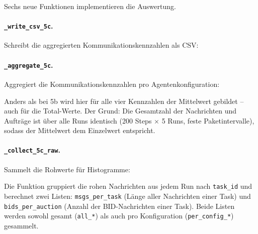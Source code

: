 
Sechs neue Funktionen implementieren die Auswertung.

\paragraph{\texttt{\_write\_csv\_5c}.}
Schreibt die aggregierten Kommunikationskennzahlen als CSV:



\paragraph{\texttt{\_aggregate\_5c}.}
Aggregiert die Kommunikationskennzahlen pro Agentenkonfiguration:



Anders als bei 5b wird hier für alle vier Kennzahlen der Mittelwert gebildet -- auch für die Total-Werte. Der Grund: Die Gesamtzahl der Nachrichten und Aufträge ist über alle Runs identisch (200 Steps $\times$ 5 Runs, feste Paketintervalle), sodass der Mittelwert dem Einzelwert entspricht.

\paragraph{\texttt{\_collect\_5c\_raw}.}
Sammelt die Rohwerte für Histogramme:



Die Funktion gruppiert die rohen Nachrichten aus jedem Run nach \texttt{task\_id} und berechnet zwei Listen: \texttt{msgs\_per\_task} (Länge aller Nachrichten einer Task) und \texttt{bids\_per\_auction} (Anzahl der BID-Nachrichten einer Task). Beide Listen werden sowohl gesamt (\texttt{all\_*}) als auch pro Konfiguration (\texttt{per\_config\_*}) gesammelt.

